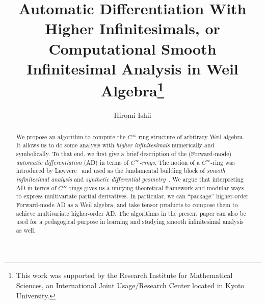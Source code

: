 \documentclass[runningheads]{llncs}
\begin{document}
%
\title{Automatic Differentiation With Higher Infinitesimals, or Computational Smooth Infinitesimal Analysis in Weil Algebra\thanks{This work was supported by the Research Institute for Mathematical Sciences, an International Joint Usage/Research Center located in Kyoto University.
}}
%
%
\author{Hiromi Ishii}
%
%
%
\maketitle              %
\begin{abstract}
  \frenchspacing
  We propose an algorithm to compute the $C^\infty$-ring structure of arbitrary Weil algebra.
  It allows us to do some analysis with \emph{higher infinitesimals} numerically and symbolically.
  To that end, we first give a brief description of the (Forward-mode) \emph{automatic differentiation} (AD) in terms of \emph{$C^\infty$-rings}.
  The notion of a $C^\infty$-ring was introduced by Lawvere~\cite{lawvere1979categorical} and used as the fundamental building block of \emph{smooth infinitesimal analysis} and \emph{synthetic differential geometry}~\cite{Moerdijk:1991aa}.
  We argue that interpreting AD in terms of $C^\infty$-rings gives us a unifying theoretical framework and modular ways to express multivariate partial derivatives.
  In particular, we can ``package'' higher-order Forward-mode AD as a Weil algebra, and take tensor products to compose them to achieve multivariate higher-order AD.
  The algorithms in the present paper can also be used for a pedagogical purpose in learning and studying smooth infinitesimal analysis as well.
\end{abstract}

\end{document}
